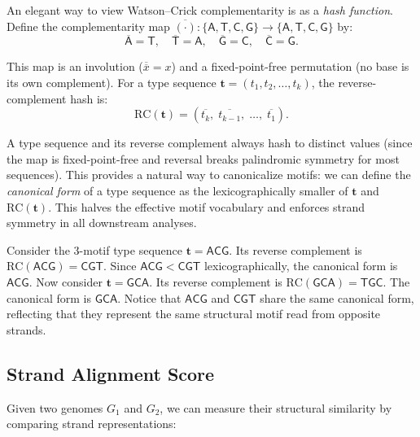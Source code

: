 An elegant way to view Watson--Crick complementarity is as a \emph{hash function}. Define the complementarity map $\overline{(\cdot)}: \{\mathsf{A}, \mathsf{T}, \mathsf{C}, \mathsf{G}\} \to \{\mathsf{A}, \mathsf{T}, \mathsf{C}, \mathsf{G}\}$ by:
\begin{equation}
\overline{\mathsf{A}} = \mathsf{T}, \quad \overline{\mathsf{T}} = \mathsf{A}, \quad \overline{\mathsf{G}} = \mathsf{C}, \quad \overline{\mathsf{C}} = \mathsf{G}.
\end{equation}

This map is an involution ($\overline{\overline{x}} = x$) and a fixed-point-free permutation (no base is its own complement). For a type sequence $\mathbf{t} = (t_1, t_2, \ldots, t_k)$, the reverse-complement hash is:
\begin{equation}
\mathrm{RC}(\mathbf{t}) = (\overline{t_k},\; \overline{t_{k-1}},\; \ldots,\; \overline{t_1}).
\label{eq:rc-hash}
\end{equation}

A type sequence and its reverse complement always hash to distinct values (since the map is fixed-point-free and reversal breaks palindromic symmetry for most sequences). This provides a natural way to canonicalize motifs: we can define the \emph{canonical form} of a type sequence as the lexicographically smaller of $\mathbf{t}$ and $\mathrm{RC}(\mathbf{t})$. This halves the effective motif vocabulary and enforces strand symmetry in all downstream analyses.

\begin{example}
\label{ex:canonical-motifs}
Consider the 3-motif type sequence $\mathbf{t} = \mathsf{ACG}$. Its reverse complement is $\mathrm{RC}(\mathsf{ACG}) = \mathsf{CGT}$. Since $\mathsf{ACG} < \mathsf{CGT}$ lexicographically, the canonical form is $\mathsf{ACG}$. Now consider $\mathbf{t} = \mathsf{GCA}$. Its reverse complement is $\mathrm{RC}(\mathsf{GCA}) = \mathsf{TGC}$. The canonical form is $\mathsf{GCA}$. Notice that $\mathsf{ACG}$ and $\mathsf{CGT}$ share the same canonical form, reflecting that they represent the same structural motif read from opposite strands.
\end{example}

\subsection{Strand Alignment Score}

Given two genomes $G_1$ and $G_2$, we can measure their structural similarity by comparing strand representations:

